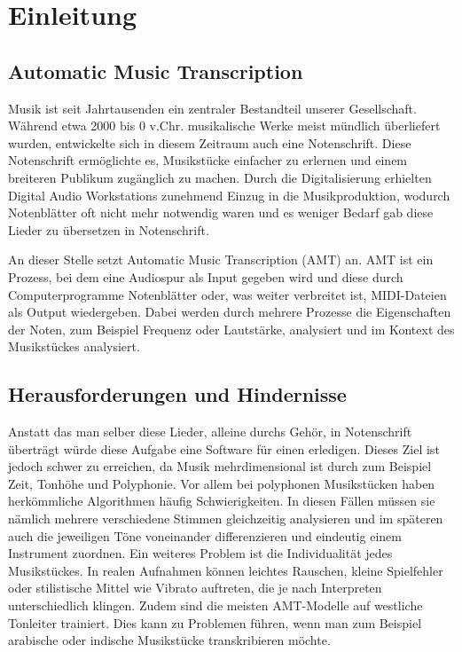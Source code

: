 \section{Einleitung}

\subsection{Automatic Music Transcription}
Musik ist seit Jahrtausenden ein zentraler Bestandteil unserer Gesellschaft.
Während etwa 2000 bis 0 v.Chr. musikalische Werke meist mündlich überliefert wurden,
entwickelte sich in diesem Zeitraum auch eine Notenschrift.
Diese Notenschrift ermöglichte es, Musikstücke einfacher zu erlernen und einem breiteren Publikum zugänglich zu machen.
Durch die Digitalisierung erhielten Digital Audio Workstations zunehmend Einzug in die Musikproduktion,
wodurch Notenblätter oft nicht mehr notwendig waren und es weniger Bedarf gab diese Lieder zu übersetzen in Notenschrift.

An dieser Stelle setzt Automatic Music Transcription (AMT) an.
AMT ist ein Prozess, bei dem eine Audiospur als Input gegeben wird und diese durch Computerprogramme
Notenblätter oder, was weiter verbreitet ist, MIDI-Dateien als Output wiedergeben.
Dabei werden durch mehrere Prozesse die Eigenschaften der Noten, zum Beispiel Frequenz oder Lautstärke,
analysiert und im Kontext des Musikstückes analysiert.

\subsection{Herausforderungen und Hindernisse}
Anstatt das man selber diese Lieder, alleine durchs Gehör,
in Notenschrift überträgt würde diese Aufgabe eine Software für einen erledigen.
Dieses Ziel ist jedoch schwer zu erreichen,
da Musik mehrdimensional ist durch zum Beispiel Zeit, Tonhöhe und Polyphonie.
Vor allem bei polyphonen Musikstücken haben herkömmliche Algorithmen häufig Schwierigkeiten.
In diesen Fällen müssen sie nämlich mehrere verschiedene Stimmen gleichzeitig analysieren und
im späteren auch die jeweiligen Töne voneinander differenzieren und eindeutig einem Instrument zuordnen.
Ein weiteres Problem ist die Individualität jedes Musikstückes.
In realen Aufnahmen können leichtes Rauschen,
kleine Spielfehler oder stilistische Mittel wie Vibrato auftreten,
die je nach Interpreten unterschiedlich klingen.
Zudem sind die meisten AMT-Modelle auf westliche Tonleiter trainiert.
Dies kann zu Problemen führen, wenn man zum Beispiel
arabische oder indische Musikstücke transkribieren möchte.

